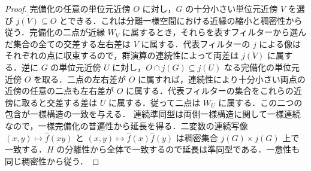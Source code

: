 \begin{proof}
完備化の任意の単位元近傍 $O$ に対し，$G$ の十分小さい単位元近傍 $V$ を選び $\overline{j(V)}\subseteq O$ とできる．これは分離一様空間における近縁の縮小と稠密性から従う．完備化の二点が近縁 $W_V$ に属するとき，それらを表すフィルターから選んだ集合の全ての交差する左右差は $V$ に属する．代表フィルターの $j$ による像はそれぞれの点に収束するので，群演算の連続性によって両差は $\overline{j(V)}$ に属する．逆に $G$ の単位元近傍 $U$ に対し，$O\cap j(G)\subseteq j(U)$ なる完備化の単位元近傍 $O$ を取る．二点の左右差が $O$ に属すれば，連続性により十分小さい両点の近傍の任意の二点も左右差が $O$ に属する．代表フィルターの集合をこれらの近傍に取ると交差する差は $U$ に属する．従って二点は $W_U$ に属する．この二つの包含が一様構造の一致を与える．
連続準同型は両側一様構造に関して一様連続なので，一様完備化の普遍性から延長を得る．二変数の連続写像 $(x,y)\mapsto\widehat f(xy)$ と $(x,y)\mapsto\widehat f(x)\widehat f(y)$ は稠密集合 $j(G)\times j(G)$ 上で一致する．$H$ の分離性から全体で一致するので延長は準同型である．一意性も同じ稠密性から従う．
\end{proof}
